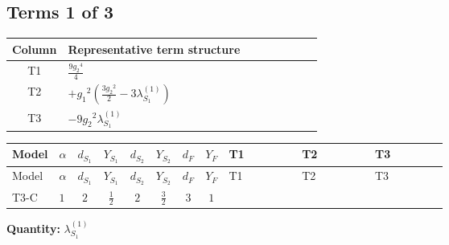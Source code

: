 \documentclass[8pt]{article}
\begin{document}
\begin{landscape}
\subsection*{Terms 1 of 3}
\begin{center}
\begin{tabular}{@{}c >{\raggedright\arraybackslash}p{0.82\linewidth}@{}}
\toprule
Column & Representative term structure \\
\midrule
T1 & \(\displaystyle \frac{9 {g_2}^4}{4}\) \\
\midrule
T2 & \(\displaystyle +{g_1}^2 \left(\frac{3 {g_2}^2}{2}-3 {\lambda_{S_1}^{(1)}}\right)\) \\
\midrule
T3 & \(\displaystyle -9 {g_2}^2 {\lambda_{S_1}^{(1)}}\) \\
\midrule
\bottomrule
\end{tabular}
\end{center}
\smallskip
\tiny
\begin{longtable}{@{}llcccccc >{\raggedright\arraybackslash}p{0.21\linewidth} >{\raggedright\arraybackslash}p{0.21\linewidth} >{\raggedright\arraybackslash}p{0.21\linewidth}@{}}
\toprule
Model & $\alpha$ & $d_{S_1}$ & $Y_{S_1}$ & $d_{S_2}$ & $Y_{S_2}$ & $d_F$ & $Y_F$ & T1 & T2 & T3 \\
\midrule
\endfirsthead
\toprule
Model & $\alpha$ & $d_{S_1}$ & $Y_{S_1}$ & $d_{S_2}$ & $Y_{S_2}$ & $d_F$ & $Y_F$ & T1 & T2 & T3 \\
\midrule
\endhead
T3-C & $1$ & $2$ & $\frac{1}{2}$ & $2$ & $\frac{3}{2}$ & $3$ & $1$ & \scriptsize\adjustbox{max width=\linewidth}{$\begin{gathered} \frac{9 {g_2}^4}{4}\end{gathered}$} & \scriptsize\adjustbox{max width=\linewidth}{$\begin{gathered} +{g_1}^2 \left(\frac{3 {g_2}^2}{2}-3 {\lambda_{S_1}^{(1)}}\right)\end{gathered}$} & \scriptsize\adjustbox{max width=\linewidth}{$\begin{gathered} -9 {g_2}^2 {\lambda_{S_1}^{(1)}}\end{gathered}$} \\
\midrule
\bottomrule
\end{longtable}
\clearpage
\noindent\textbf{Quantity: }$\lambda_{S_1}^{(1)}$\par\smallskip

\end{landscape}
\end{document}
